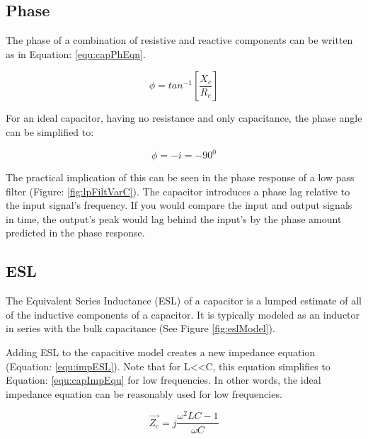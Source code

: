

\subsection{Phase}

The phase of a combination of resistive and reactive components can be written as in Equation: \eqref{equ:capPhEqn}.

\begin{equation}
\label{equ:capPhEqn}
\phi = tan^{-1}[\frac{X_c}{R_c}]
\end{equation}

For an ideal capacitor, having no resistance and only capacitance, the phase angle can be simplified to:

\begin{equation}
\label{equ:capImpEqu2}
\phi = -i = -90^0
\end{equation}

The practical implication of this can be seen in the phase response of a low pass filter (Figure: \ref{fig:lpFiltVarC}). The capacitor introduces a phase lag relative to the input signal's frequency. If you would compare the input and output signals in time, the output's peak would lag behind the input's by the phase amount predicted in the phase response.


\subsection{ESL}

The Equivalent Series Inductance (ESL) of a capacitor is a lumped estimate of all of the inductive components of a capacitor. It is typically modeled as an inductor in series with the bulk capacitance (See Figure \ref{fig:eslModel}).



Adding ESL to the capacitive model creates a new impedance equation (Equation: \eqref{equ:impESL}). Note that for L\textless \textless C, this equation simplifies to Equation: \eqref{equ:capImpEqu} for low frequencies. In other words, the ideal impedance equation can be reasonably used for low frequencies.

\begin{equation}
\label{equ:impESL}
\vec{Z_c} = j\frac{\omega ^2LC - 1}{\omega C}
\end{equation}



